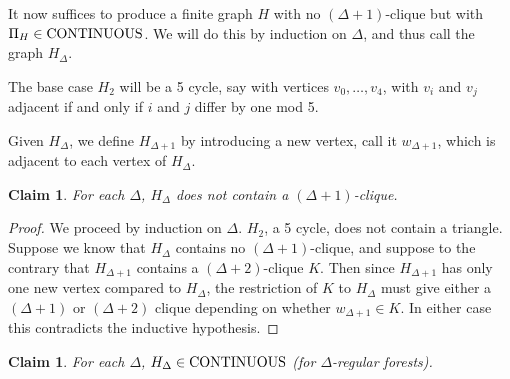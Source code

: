 \documentclass[11pt]{amsart}
\newtheorem{claim}[theorem]{Claim}
\theoremstyle{definition}
\begin{document}
It now suffices to produce a finite graph $H$ with no $(\Delta+1)$-clique but with $\Pi_H \in \textnormal{CONTINUOUS}$. We will do this by induction on $\Delta$, and thus call the graph $H_\Delta$.

The base case $H_2$ will be a 5 cycle, say with vertices $v_0,\ldots,v_4$, with $v_i$ and $v_j$ adjacent if and only if $i$ and $j$ differ by one mod 5. 

Given $H_\Delta$, we define $H_{\Delta+1}$ by introducing a new vertex, call it $w_{\Delta+1}$, which is adjacent to each vertex of $H_\Delta$.

\begin{claim}
For each $\Delta$, $H_\Delta$ does not contain a $(\Delta+1)$-clique.
\end{claim}

\begin{proof}
We proceed by induction on $\Delta$. $H_2$, a 5 cycle, does not contain a triangle. Suppose we know that $H_\Delta$ contains no $(\Delta+1)$-clique, and suppose to the contrary that $H_{\Delta+1}$ contains a $(\Delta+2)$-clique $K$. Then since $H_{\Delta+1}$ has only one new vertex compared to $H_\Delta$, the restriction of $K$ to $H_\Delta$ must give either a $(\Delta+1)$ or $(\Delta+2)$ clique depending on whether $w_{\Delta+1} \in K$. In either case this contradicts the inductive hypothesis.
\end{proof}

\begin{claim}
For each $\Delta$, $H_\Delta \in \textnormal{CONTINUOUS}$ (for $\Delta$-regular forests).
\end{claim}
\end{document}
